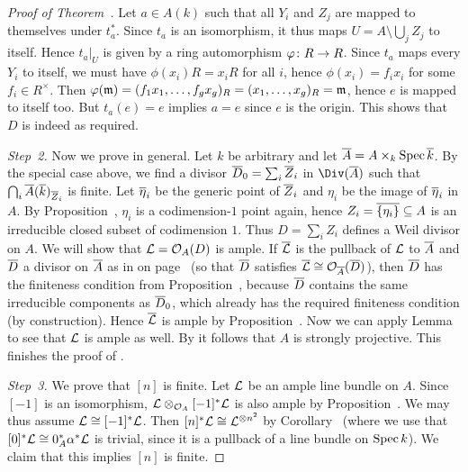 \documentclass[a4paper,parskip=half,numbers=enddot, DIV=12]{scrreprt}
\begin{document}
\begin{proof}[Proof of Theorem~]
	Let $a\in A(k)$ such that all $Y_i$ and $Z_j$ are mapped to themselves under $t_a^*$. Since $t_a$ is an isomorphism, it thus maps $U=A\setminus \bigcup_jZ_j$ to itself. Hence $t_a|_U$ is given by a ring automorphism $\phi\colon R\morphism R$. Since $t_a$ maps every $Y_i$ to itself, we must have $\phi(x_i)R=x_iR$ for all $i$, hence $\phi(x_i)=f_ix_i$ for some $f_i\in R^\times$. Then $\varphi(\mathfrak{m})=(f_1x_1,\ldots,f_gx_g)_R=(x_1,\ldots,x_g)_R=\mathfrak{m}$, hence $e$ is mapped to itself too. But $t_a(e)=e$ implies $a=e$ since $e$ is the origin. This shows that $D$ is indeed as required.
	
	\emph{Step~2.} Now we prove  in general. Let $k$ be arbitrary and let $\overline{A}=A\times_k\operatorname{Spec} \overline{k}$. By the special case above, we find a divisor $\overline{D}_0=\sum_i\overline{Z}_i$ in $\Div(\ov{A})$ such that $\bigcap_i\overline{A}(\overline{k})_{\overline{Z}_i}$ is finite. Let $\overline{\eta}_i$ be the generic point of $\overline{Z}_i$ and $\eta_i$ be the image of $\overline{\eta}_i$ in $A$. By Proposition~, $\eta_i$ is a codimension-$1$ point again, hence $Z_i=\overline{\{\eta_i\}}\subseteq A$ is an irreducible closed subset of codimension $1$. Thus $D=\sum_iZ_i$ defines a Weil divisor on $A$. We will show that $\mathcal{L}=\mathcal{O}_A(D)$ is ample. If $\overline{\mathcal{L}}$ is the pullback of $\mathcal{L}$ to $\overline{A}$ and $\overline{D}$ a divisor on $\overline{A}$ as in  on page~\pageref{par:divisorPullback} (so that $\overline{D}$ satisfies $\overline{\mathcal{L}}\cong\mathcal{O}_{\overline{A}}(\overline{D})$), then $\overline{D}$ has the finiteness condition from Proposition~, because $\overline{D}$ contains the same irreducible components as $\overline{D}_0$, which already has the required finiteness condition (by construction). Hence $\overline{\mathcal{L}}$ is ample by Proposition~. Now we can apply Lemma~ to see that $\mathcal{L}$ is ample as well. By \cite[Theorem~6]{alggeo2} it follows that $A$ is strongly projective. This finishes the proof of .
	
	\emph{Step~3.} We prove that $[n]$ is finite. Let $\mathcal{L}$ be an ample line bundle on $A$. Since $[-1]$ is an isomorphism, $\mathcal{L}\otimes_{\mathcal{O}_A}[-1]^*\mathcal{L}$ is also ample by Proposition~. We may thus assume $\mathcal{L}\cong [-1]^*\mathcal{L}$. Then $[n]^*\mathcal{L}\cong \mathcal{L}^{\otimes n^2}$ by Corollary~ (where we use that $[0]^*\mathcal{L}\cong 0_A^*\alpha^*\mathcal{L}$ is trivial, since it is a pullback of a line bundle on $\operatorname{Spec} k$). We claim that this implies $[n]$ is finite. 
	

\end{proof}
\end{document}
